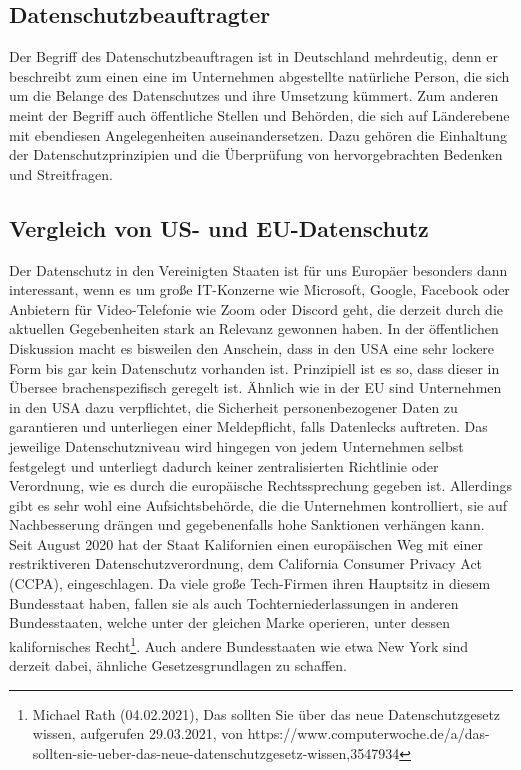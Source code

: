 \subsection{Datenschutzbeauftragter}
    Der Begriff des Datenschutzbeauftragen ist in Deutschland mehrdeutig, denn er beschreibt zum einen eine im Unternehmen abgestellte natürliche Person, die sich um die Belange des Datenschutzes und ihre Umsetzung kümmert. Zum anderen meint der Begriff auch öffentliche Stellen und Behörden, die sich auf Länderebene mit ebendiesen Angelegenheiten auseinandersetzen. Dazu gehören die Einhaltung der Datenschutzprinzipien und die Überprüfung von hervorgebrachten Bedenken und Streitfragen.

\subsection{Vergleich von US- und EU-Datenschutz}
    Der Datenschutz in den Vereinigten Staaten ist für uns Europäer besonders dann interessant, wenn es um große IT-Konzerne wie Microsoft, Google, Facebook oder Anbietern für Video-Telefonie wie Zoom oder Discord geht, die derzeit durch die aktuellen Gegebenheiten stark an Relevanz gewonnen haben. In der öffentlichen Diskussion macht es bisweilen den Anschein, dass in den USA eine sehr lockere Form bis gar kein Datenschutz vorhanden ist. Prinzipiell ist es so, dass dieser in Übersee brachenspezifisch geregelt ist. Ähnlich wie in der EU sind Unternehmen in den USA dazu verpflichtet, die Sicherheit personenbezogener Daten zu garantieren und unterliegen einer Meldepflicht, falls Datenlecks auftreten. Das jeweilige Datenschutzniveau wird hingegen von jedem Unternehmen selbst festgelegt und unterliegt dadurch keiner zentralisierten Richtlinie oder Verordnung, wie es durch die europäische Rechtssprechung gegeben ist. Allerdings gibt es sehr wohl eine Aufsichtsbehörde, die die Unternehmen kontrolliert, sie auf Nachbesserung drängen und gegebenenfalls hohe Sanktionen verhängen kann.\\
    Seit August 2020 hat der Staat Kalifornien einen \glqq europäischen Weg\grqq{} mit einer restriktiveren Datenschutzverordnung, dem California Consumer Privacy Act (CCPA), eingeschlagen. Da viele große Tech-Firmen ihren Hauptsitz in diesem Bundesstaat haben, fallen sie als auch Tochterniederlassungen in anderen Bundesstaaten, welche unter der gleichen Marke operieren, unter dessen kalifornisches Recht\footnote{Michael Rath (04.02.2021), Das sollten Sie über das neue Datenschutzgesetz wissen, aufgerufen 29.03.2021, von https://www.computerwoche.de/a/das-sollten-sie-ueber-das-neue-datenschutzgesetz-wissen,3547934}. Auch andere Bundesstaaten wie etwa New York sind derzeit dabei, ähnliche Gesetzesgrundlagen zu schaffen.\\
